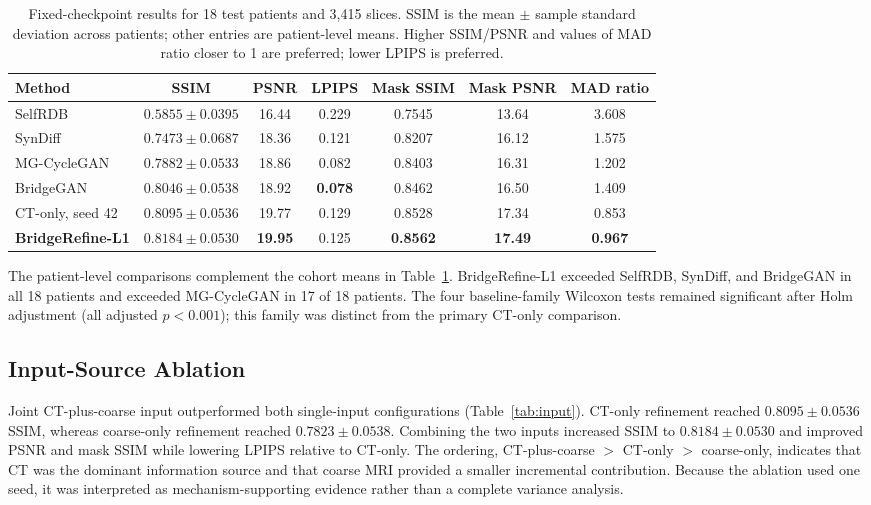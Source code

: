 \begin{table}[htbp]
\centering
\caption{Fixed-checkpoint results for 18 test patients and 3,415 slices. SSIM is the mean $\pm$ sample standard deviation across patients; other entries are patient-level means. Higher SSIM/PSNR and values of MAD ratio closer to 1 are preferred; lower LPIPS is preferred.}
\label{tab:main}
\setlength{\tabcolsep}{3.5pt}
\small
\begin{tabular}{lcccccc}
\toprule
Method & SSIM & PSNR & LPIPS & Mask SSIM & Mask PSNR & MAD ratio\\
\midrule
SelfRDB & $0.5855\pm0.0395$ & 16.44 & 0.229 & 0.7545 & 13.64 & 3.608\\
SynDiff & $0.7473\pm0.0687$ & 18.36 & 0.121 & 0.8207 & 16.12 & 1.575\\
MG-CycleGAN & $0.7882\pm0.0533$ & 18.86 & 0.082 & 0.8403 & 16.31 & 1.202\\
BridgeGAN & $0.8046\pm0.0538$ & 18.92 & \textbf{0.078} & 0.8462 & 16.50 & 1.409\\
CT-only, seed 42 & $0.8095\pm0.0536$ & 19.77 & 0.129 & 0.8528 & 17.34 & 0.853\\
\textbf{BridgeRefine-L1} & $\mathbf{0.8184\pm0.0530}$ & \textbf{19.95} & 0.125 & \textbf{0.8562} & \textbf{17.49} & \textbf{0.967}\\
\bottomrule
\end{tabular}
\end{table}

The patient-level comparisons complement the cohort means in Table~\ref{tab:main}. BridgeRefine-L1 exceeded SelfRDB, SynDiff, and BridgeGAN in all 18 patients and exceeded MG-CycleGAN in 17 of 18 patients. The four baseline-family Wilcoxon tests remained significant after Holm adjustment (all adjusted $p<0.001$); this family was distinct from the primary CT-only comparison.


\subsection{Input-Source Ablation}

Joint CT-plus-coarse input outperformed both single-input configurations (Table~\ref{tab:input}). CT-only refinement reached $0.8095\pm0.0536$ SSIM, whereas coarse-only refinement reached $0.7823\pm0.0538$. Combining the two inputs increased SSIM to $0.8184\pm0.0530$ and improved PSNR and mask SSIM while lowering LPIPS relative to CT-only. The ordering, CT-plus-coarse $>$ CT-only $>$ coarse-only, indicates that CT was the dominant information source and that coarse MRI provided a smaller incremental contribution. Because the ablation used one seed, it was interpreted as mechanism-supporting evidence rather than a complete variance analysis.

